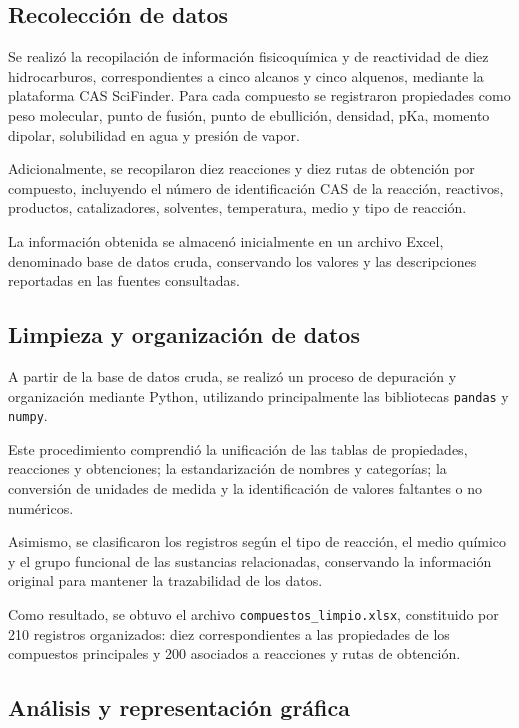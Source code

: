 
\subsection{Recolección de datos}

Se realizó la recopilación de información fisicoquímica y de reactividad de diez hidrocarburos, correspondientes a cinco alcanos y cinco alquenos, mediante la plataforma CAS SciFinder. Para cada compuesto se registraron propiedades como peso molecular, punto de fusión, punto de ebullición, densidad, pKa, momento dipolar, solubilidad en agua y presión de vapor.

Adicionalmente, se recopilaron diez reacciones y diez rutas de obtención por compuesto, incluyendo el número de identificación CAS de la reacción, reactivos, productos, catalizadores, solventes, temperatura, medio y tipo de reacción.

La información obtenida se almacenó inicialmente en un archivo Excel, denominado base de datos cruda, conservando los valores y las descripciones reportadas en las fuentes consultadas.

\subsection{Limpieza y organización de datos}

A partir de la base de datos cruda, se realizó un proceso de depuración y organización mediante Python, utilizando principalmente las bibliotecas \texttt{pandas} y \texttt{numpy}.

Este procedimiento comprendió la unificación de las tablas de propiedades, reacciones y obtenciones; la estandarización de nombres y categorías; la conversión de unidades de medida y la identificación de valores faltantes o no numéricos.

Asimismo, se clasificaron los registros según el tipo de reacción, el medio químico y el grupo funcional de las sustancias relacionadas, conservando la información original para mantener la trazabilidad de los datos.

Como resultado, se obtuvo el archivo \texttt{compuestos\_limpio.xlsx}, constituido por 210 registros organizados: diez correspondientes a las propiedades de los compuestos principales y 200 asociados a reacciones y rutas de obtención.

\subsection{Análisis y representación gráfica}

